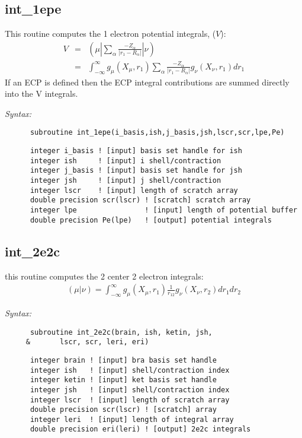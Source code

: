 \subsection{int\_1epe} 
This routine computes the 1 electron potential integrals, ($V$): 
\begin{eqnarray*} 
V & = & ({\mu}|\sum_{\alpha}\frac{-Z_{\alpha}}{|r_{1}-R_{\alpha}|}|{\nu}) \\ 
  & = & \int_{-\infty}^{\infty} g_{\mu}(X_{\mu},r_{1})\sum_{\alpha}\frac 
{-Z_{\alpha}}{|r_{1}-R_{\alpha}|}g_{\nu}(X_{\nu},r_{1})dr_{1}  
\end{eqnarray*} 
If an ECP is defined then the ECP integral contributions are summed  
directly into the V integrals.   
 
{\it Syntax:} 
\begin{verbatim} 
      subroutine int_1epe(i_basis,ish,j_basis,jsh,lscr,scr,lpe,Pe) 
\end{verbatim} 
\begin{verbatim} 
      integer i_basis ! [input] basis set handle for ish 
      integer ish     ! [input] i shell/contraction 
      integer j_basis ! [input] basis set handle for jsh 
      integer jsh     ! [input] j shell/contraction 
      integer lscr    ! [input] length of scratch array 
      double precision scr(lscr) ! [scratch] scratch array 
      integer lpe                ! [input] length of potential buffer 
      double precision Pe(lpe)   ! [output] potential integrals 
\end{verbatim} 
\subsection{int\_2e2c} 
this routine computes the 2 center 2 electron integrals:  
\begin{eqnarray*} 
({\mu}|{\nu}) = \int_{-\infty}^{\infty} g_{\mu}(X_{\mu},r_{1})\frac{1}{r_{12}}g_{\nu}(X_{\nu},r_{2})dr_{1}dr_{2} 
\end{eqnarray*} 
 
{\it Syntax:} 
\begin{verbatim} 
      subroutine int_2e2c(brain, ish, ketin, jsh,  
     &       lscr, scr, leri, eri) 
\end{verbatim} 
\begin{verbatim} 
      integer brain ! [input] bra basis set handle 
      integer ish   ! [input] shell/contraction index 
      integer ketin ! [input] ket basis set handle 
      integer jsh   ! [input] shell/contraction index 
      integer lscr  ! [input] length of scratch array 
      double precision scr(lscr) ! [scratch] array 
      integer leri  ! [input] length of integral array 
      double precision eri(leri) ! [output] 2e2c integrals 
\end{verbatim} 
